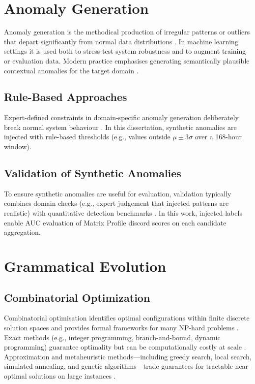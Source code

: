\section{Anomaly Generation}

Anomaly generation is the methodical production of irregular patterns or outliers that depart significantly from normal data distributions \parencite{hawkins1980}.
In machine learning settings it is used both to stress-test system robustness \parencite{chandola2009} and to augment training or evaluation data.
Modern practice emphasises generating semantically plausible contextual anomalies for the target domain \parencite{ruff2021}.

\subsection{Rule-Based Approaches}

Expert-defined constraints in domain-specific anomaly generation deliberately break normal system behaviour \parencite{chandola2009}.
In this dissertation, synthetic anomalies are injected with rule-based thresholds (e.g., values outside $\mu \pm 3\sigma$ over a 168-hour window).

\subsection{Validation of Synthetic Anomalies}

To ensure synthetic anomalies are useful for evaluation, validation typically combines domain checks (e.g., expert judgement that injected patterns are realistic) with quantitative detection benchmarks \parencite{ruff2021}.
In this work, injected labels enable \ac{AUC} evaluation of Matrix Profile discord scores on each candidate aggregation.

\section{Grammatical Evolution}

\subsection{Combinatorial Optimization}

Combinatorial optimisation identifies optimal configurations within finite discrete solution spaces and provides formal frameworks for many NP-hard problems \parencite{papadimitriou1982,garey1979}.
Exact methods (e.g., integer programming, branch-and-bound, dynamic programming) guarantee optimality but can be computationally costly at scale \parencite{papadimitriou1998}.
Approximation and metaheuristic methods---including greedy search, local search, simulated annealing, and genetic algorithms---trade guarantees for tractable near-optimal solutions on large instances \parencite{vazirani2001,glover1989,zlochin2004}.

